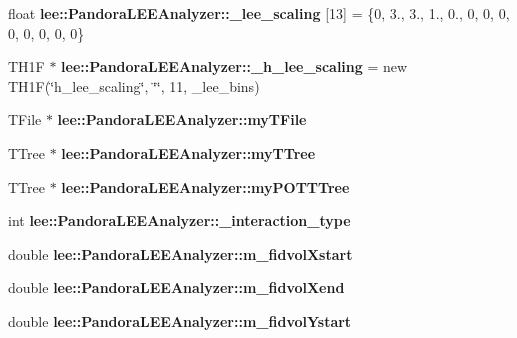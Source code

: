 \begin{DoxyCompactItemize}
\item 
\hypertarget{group__lee_ga917c3c0cff016b2757b303818dc9b138}{float {\bfseries lee\-::\-Pandora\-L\-E\-E\-Analyzer\-::\-\_\-lee\-\_\-scaling} \mbox{[}13\mbox{]} = \{0, 3., 3., 1., 0., 0, 0, 0, 0, 0, 0, 0, 0\}}\label{group__lee_ga917c3c0cff016b2757b303818dc9b138}

\item 
\hypertarget{group__lee_ga23a7d7c06b601ec3488237c7a70a79f0}{T\-H1\-F $\ast$ {\bfseries lee\-::\-Pandora\-L\-E\-E\-Analyzer\-::\-\_\-h\-\_\-lee\-\_\-scaling} = new T\-H1\-F(\char`\"{}h\-\_\-lee\-\_\-scaling\char`\"{}, \char`\"{}\char`\"{}, 11, \-\_\-lee\-\_\-bins)}\label{group__lee_ga23a7d7c06b601ec3488237c7a70a79f0}

\item 
\hypertarget{group__lee_ga8a86ec4686558f03c8a2be30a6bbcc2a}{T\-File $\ast$ {\bfseries lee\-::\-Pandora\-L\-E\-E\-Analyzer\-::my\-T\-File}}\label{group__lee_ga8a86ec4686558f03c8a2be30a6bbcc2a}

\item 
\hypertarget{group__lee_ga20daae4b8c56ed5c2c2fd6b7b2a490dc}{T\-Tree $\ast$ {\bfseries lee\-::\-Pandora\-L\-E\-E\-Analyzer\-::my\-T\-Tree}}\label{group__lee_ga20daae4b8c56ed5c2c2fd6b7b2a490dc}

\item 
\hypertarget{group__lee_ga3c10053a4ef8cb336589fb86a5b6f587}{T\-Tree $\ast$ {\bfseries lee\-::\-Pandora\-L\-E\-E\-Analyzer\-::my\-P\-O\-T\-T\-Tree}}\label{group__lee_ga3c10053a4ef8cb336589fb86a5b6f587}

\item 
\hypertarget{group__lee_gafd61fa715317d7a54f36339589736b1e}{int {\bfseries lee\-::\-Pandora\-L\-E\-E\-Analyzer\-::\-\_\-interaction\-\_\-type}}\label{group__lee_gafd61fa715317d7a54f36339589736b1e}

\item 
\hypertarget{group__lee_ga56d3f395f76ae35174ea4714598debb2}{double {\bfseries lee\-::\-Pandora\-L\-E\-E\-Analyzer\-::m\-\_\-fidvol\-Xstart}}\label{group__lee_ga56d3f395f76ae35174ea4714598debb2}

\item 
\hypertarget{group__lee_gac263324598456c587395ce39f9a86b4a}{double {\bfseries lee\-::\-Pandora\-L\-E\-E\-Analyzer\-::m\-\_\-fidvol\-Xend}}\label{group__lee_gac263324598456c587395ce39f9a86b4a}

\item 
\hypertarget{group__lee_ga678aca01684db5a8a9abcb6903a7eee5}{double {\bfseries lee\-::\-Pandora\-L\-E\-E\-Analyzer\-::m\-\_\-fidvol\-Ystart}}\label{group__lee_ga678aca01684db5a8a9abcb6903a7eee5}


\end{DoxyCompactItemize}
